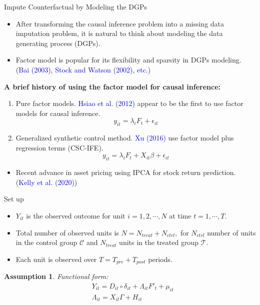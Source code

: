 \documentclass{beamer}
\newtheorem{assumption}{Assumption}
\begin{document}
\begin{frame}{Impute Counterfactual by Modeling the DGPs}
\begin{itemize}
    \item After transforming the causal inference problem into a missing data imputation problem, it is natural to think about modeling the data generating process (DGPs).
    \item Factor model is popular for its flexibility and sparsity in DGPs modeling. (\textcolor{blue}{Bai (2003)}, \textcolor{blue}{Stock and Watson (2002), etc.})
\end{itemize}

\textbf{A brief history of using the factor model for causal inference:}
\begin{enumerate}
    \item Pure factor models. \textcolor{blue}{Hsiao et al. (2012)} appear to be the first to use factor models for causal inference.
    $$y_{it} = \lambda_i F_t + \epsilon_{it}$$
    \item Generalized synthetic control method. \textcolor{blue}{Xu (2016)} use factor model plus regression terms (CSC-IFE).
    $$y_{it} = \lambda_{i} F_t + X_{it} \beta + \epsilon_{it}$$
\end{enumerate}

\begin{itemize}
    \item Recent advance in asset pricing using IPCA for stock return prediction. (\textcolor{blue}{Kelly et al. (2020)})
\end{itemize}

\end{frame}

\begin{frame}{Set up}
    \begin{itemize}
        \item $Y_{it}$ is the observed outcome for unit $i=1,2,\cdots, N$ at time $t=1,\cdots,T.$
        \item Total number of observed units is $N=N_{treat}+N_{ctrl},$ for $N_{ctrl}$ number of units in the control group $\mathcal{C}$ and $N_{treat}$ units in the treated group $\mathcal{T}$.
        \item Each unit is observed over $T=T_{pre}+T_{post}$ periods.
    \end{itemize}

\begin{assumption}
    Functional form:
    \begin{align*}
        & Y_{it} = D_{it}\circ \delta_{it} + \Lambda_{it}F'_t + \mu_{it} \\
        & \Lambda_{it} = X_{it}\Gamma + H_{it}
    \end{align*}
\end{assumption}
\end{frame}
\end{document}
